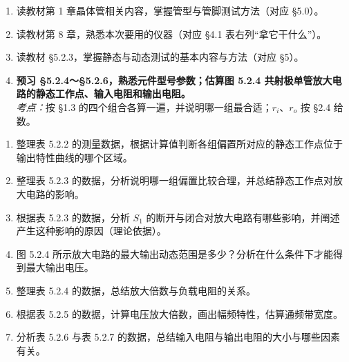\documentclass[11pt]{ctexart}
\let\orighdr\hdr
\renewcommand{\hdr}[2]{\needspace{12\baselineskip}\orighdr{#1}{#2}}
\let\origsubhdr\subhdr
\renewcommand{\subhdr}[1]{\needspace{3\baselineskip}\origsubhdr{#1}}
\begin{document}

\begin{enumerate}
\item 读教材第 1 章晶体管相关内容，掌握管型与管脚测试方法（对应 §5.0）。
\item 读教材第 8 章，熟悉本次要用的仪器（对应 §4.1 表右列“拿它干什么”）。
\item 读教材 §5.2.3，掌握静态与动态测试的基本内容与方法（对应 §5）。
\item \textbf{预习 §5.2.4～§5.2.6，熟悉元件型号参数；估算图 5.2.4 共射极单管放大电路的静态工作点、输入电阻和输出电阻。}\\
\textit{考点：}按 §1.3 的四个组合各算一遍，并说明哪一组最合适；$r_i$、$r_o$ 按 §2.4 给数。
\end{enumerate}


\begin{enumerate}
\item 整理表 5.2.2 的测量数据，根据计算值判断各组偏置所对应的静态工作点位于输出特性曲线的哪个区域。
\item 整理表 5.2.3 的数据，分析说明哪一组偏置比较合理，并总结静态工作点对放大电路的影响。
\item 根据表 5.2.3 的数据，分析 $S_1$ 的断开与闭合对放大电路有哪些影响，并阐述产生这种影响的原因（理论依据）。
\item 图 5.2.4 所示放大电路的最大输出动态范围是多少？分析在什么条件下才能得到最大输出电压。
\item 整理表 5.2.4 的数据，总结放大倍数与负载电阻的关系。
\item 根据表 5.2.5 的数据，计算电压放大倍数，画出幅频特性，估算通频带宽度。
\item 分析表 5.2.6 与表 5.2.7 的数据，总结输入电阻与输出电阻的大小与哪些因素有关。
\end{enumerate}

\end{document}
